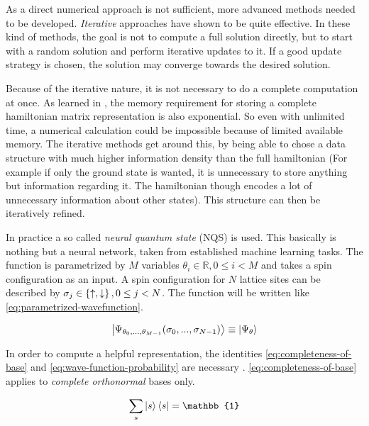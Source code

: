 As a direct numerical approach is not sufficient, more advanced methods needed to be developed. 
\emph{Iterative} approaches have shown to be quite effective. 
In these kind of methods, the goal is not to compute a full solution directly, but to start with a random solution and perform iterative updates to it. 
If a good update strategy is chosen, the solution may converge towards the desired solution.

Because of the iterative nature, it is not necessary to do a complete computation at once. 
As learned in , the memory requirement for storing a complete hamiltonian matrix representation is also exponential.
So even with unlimited time, a numerical calculation could be impossible because of limited available memory. 
The iterative methods get around this, by being able to chose a data structure with much higher information density than the full hamiltonian (For example if only the ground state is wanted, it is unnecessary to store anything but information regarding it. The hamiltonian though encodes a lot of \glqq unnecessary\grqq{} information about other states). This structure can then be iteratively refined.

In practice a so called \emph{neural quantum state} (NQS) is used. 
This basically is nothing but a neural network, taken from established machine learning tasks.
The function is parametrized by $M$ variables $\theta_i \in \mathbb{R}, 0\leq i < M$ and takes a spin configuration as an input.
A spin configuration for $N$ lattice sites can be described by $\sigma_j \in \left\{\uparrow, \downarrow\right\}, 0\leq j < N$.
The function will be written like \autoref{eq:parametrized-wavefunction}.

\begin{equation}
    \label{eq:parametrized-wavefunction}
    \ket{\Psi_{\theta_0, ..., \theta_{M-1}}(\sigma_0, ..., \sigma_{N-1})} \equiv \ket{\Psi_\theta}
\end{equation}

In order to compute a helpful representation, the identities \autoref{eq:completeness-of-base} and \autoref{eq:wave-function-probability} are necessary \cite{schwablQM}. \autoref{eq:completeness-of-base} applies to \emph{complete orthonormal} bases only.

\begin{equation}
    \label{eq:completeness-of-base}
    \sum\limits_{s} \ket{s}\bra{s} = \mathbb{1}
\end{equation}

